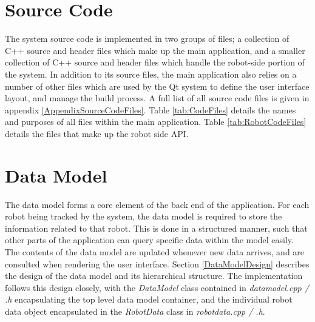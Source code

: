 
\section{Source Code}
The system source code is implemented in two groups of files; a collection of C++ source and header files which make up the main application, and a smaller collection of C++ source and header files which handle the robot-side portion of the system. In addition to its source files, the main application also relies on a number of other files which are used by the Qt system to define the user interface layout, and manage the build process. A full list of all source code files is given in appendix \ref{AppendixSourceCodeFiles}. Table \ref{tab:CodeFiles} details the names and purposes of all files within the main application. Table \ref{tab:RobotCodeFiles} details the files that make up the robot side API.


\section{Data Model} \label{DataModel}
The data model forms a core element of the back end of the application. For each robot being tracked by the system, the data model is required to store the information related to that robot. This is done in a structured manner, such that other parts of the application can query specific data within the model easily. The contents of the data model are updated whenever new data arrives, and are consulted when rendering the user interface. Section \ref{DataModelDesign} describes the design of the data model and its hierarchical structure. The implementation follows this design closely, with the \textit{DataModel} class contained in \textit{datamodel.cpp / .h} encapsulating the top level data model container, and the individual robot data object encapsulated in the \textit{RobotData} class in \textit{robotdata.cpp / .h}.

